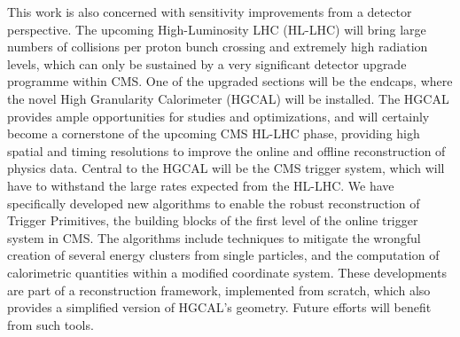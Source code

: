 {This work is also concerned with sensitivity improvements from a detector perspective.
The upcoming High-Luminosity LHC (HL-LHC) will bring large numbers of collisions per proton bunch crossing and extremely high radiation levels, which can only be sustained by a very significant detector upgrade programme within CMS.
One of the upgraded sections will be the endcaps, where the novel High Granularity Calorimeter (HGCAL) will be installed.
The HGCAL provides ample opportunities for studies and optimizations, and will certainly become a cornerstone of the upcoming CMS HL-LHC phase, providing high spatial and timing resolutions to improve the online and offline reconstruction of physics data.
Central to the HGCAL will be the CMS trigger system, which will have to withstand the large rates expected from the HL-LHC.
We have specifically developed new algorithms to enable the robust reconstruction of Trigger Primitives, the building blocks of the first level of the online trigger system in CMS.
The algorithms include techniques to mitigate the wrongful creation of several energy clusters from single particles, and the computation of calorimetric quantities within a modified coordinate system.
These developments are part of a reconstruction framework, implemented from scratch, which also provides a simplified version of HGCAL's geometry.
Future efforts will benefit from such tools.}															%
